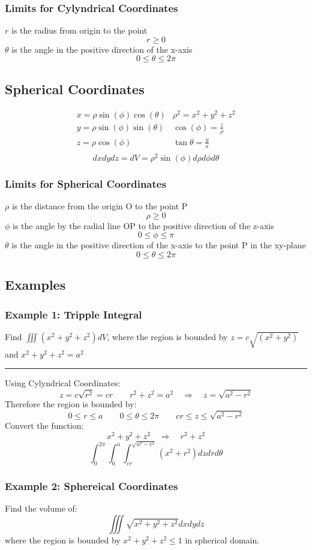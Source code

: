\subsubsection{Limits for Cylyndrical Coordinates}
$r$ is the radius from origin to the point
$$r\geq 0$$
$\theta$ is the angle in the positive direction of the x-axis
$$0\leq\theta \leq 2\pi$$

\subsection{Spherical Coordinates}
$$\begin{array}{ll}
  x=\rho \sin(\phi) \cos(\theta)&\rho^2=x^2+y^2+z^2\\       
  y=\rho \sin(\phi) \sin(\theta)&\cos(\phi)=\frac{z}{\rho}\\
  z=\rho \cos(\phi)&             \tan \theta=\frac{y}{x}\\  
\end{array}$$
$$dx dydz=dV=\rho^{2}\sin(\phi)d\rho d\phi d\theta$$
\subsubsection{Limits for Spherical Coordinates}
$\rho$ is the distance from the origin O to the point P
$$\rho \geq 0$$
$\phi$ is the angle by the radial line OP to the positive direction of the z-axis
$$0\leq \phi \leq \pi$$
$\theta$ is the angle in the positive direction of the x-axis to the point P in the xy-plane
$$0\leq\theta \leq 2\pi$$

\subsection{Examples}
\subsubsection{Example 1: Tripple Integral}
Find $\iiint(x^{2}+y^{2}+z^{2})d V$, where the region is bounded by
$z=c\sqrt{(x^{2}+y^{2})}$ and $x^{2}+y^{2}+z^{2}=a^{2}$

\rule{\textwidth}{1pt}

Using Cylyndrical Coordinates:
$$z=c\sqrt{r^2}=cr\qquad r^2+z^2=a^2\quad\Rightarrow\quad z=\sqrt{a^2-r^2}$$
Therefore the region is bounded by:
$$0\leq r\leq a\qquad 0\leq\theta\leq 2\pi\qquad cr\leq z\leq\sqrt{a^2-r^2}$$
Convert the function:
$$x^2+y^2+z^2\quad\Rightarrow\quad r^2+z^2$$
$$\int_0^{2\pi}\int_0^a\int_{cr}^{\sqrt{a^2-r^2}}(x^2+r^2)dzdrd\theta$$
\subsubsection{Example 2: Sphereical Coordinates}
Find the volume of:
$$\iiint\sqrt{x^2+y^2+z^2}dxdydz$$
where the region is bounded by $x^2+y^2+z^2\leq1$ in spherical domain.

